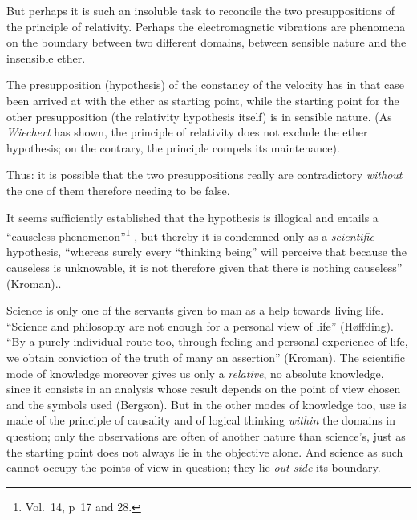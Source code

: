 \documentclass[12pt,a4paper]{article}
\begin{document}
But perhaps it is such an insoluble task to reconcile the two presuppositions
of the principle of relativity. Perhaps the electromagnetic vibrations are
phenomena on the boundary between two different domains, between sensible
nature and the insensible ether.

The presupposition (hypothesis) of the constancy of the velocity has in that
case been arrived at with the ether as starting point, while the starting
point for the other presupposition (the relativity hypothesis itself) is in
sensible nature. (As \emph{Wiechert} has shown, the principle of relativity
does not exclude the ether hypothesis; on the contrary, the principle compels
its maintenance).

Thus: it is possible that the two presuppositions really are contradictory
\emph{without} the one of them therefore needing to be false.

\bigskip

It seems sufficiently established that the hypothesis is illogical and entails
a ``causeless phenomenon''\footnote{Vol.\ 14, p\ 17 and 28.}%
, but thereby it is condemned only as a \emph{scientific} hypothesis,
``whereas surely every
``thinking being'' will perceive that because the causeless is unknowable, it
is not therefore given that there is nothing causeless'' (Kroman)..%

Science is only one of the servants given to man as a help towards living
life. ``Science and philosophy are not enough for a personal view of life''
(Høffding). ``By a purely individual route too, through feeling and personal
experience of life, we obtain conviction of the truth of many an assertion''
(Kroman). The scientific mode of knowledge moreover gives us only a
\emph{relative}, no absolute knowledge, since it consists in an analysis whose
result depends on the point of view chosen and the symbols used (Bergson). But
in the other modes of knowledge too, use is made of the principle of causality
and of logical thinking \emph{within} the domains in question; only the
observations are often of another nature than science's, just as the starting
point does not always lie in the objective alone. And science as such cannot
occupy the points of view in question; they lie \emph{out side} its boundary.
\end{document}
